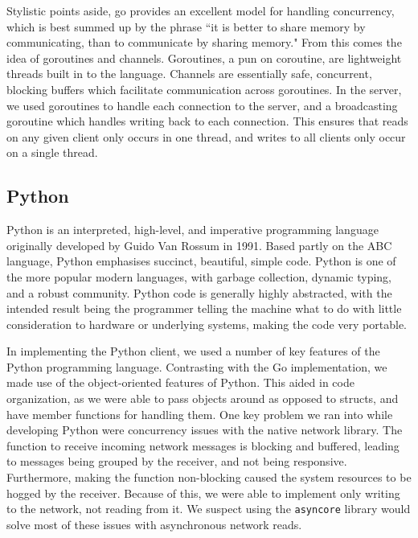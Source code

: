 \documentclass[12pt, letterpaper]{article}
\begin{document}
Stylistic points aside, go provides an excellent model for handling 
concurrency, which is best summed up by the phrase ``it is better to 
share memory by communicating, than to communicate by sharing memory." 
From this comes the idea of goroutines and channels. Goroutines, a pun 
on coroutine, are lightweight threads built in to the language. 
Channels are essentially safe, concurrent, blocking buffers which 
facilitate communication across goroutines. In the server, we used 
goroutines to handle each connection to the server, and a broadcasting 
goroutine which handles writing back to each connection. This ensures 
that reads on any given client only occurs in one thread, and writes to 
all clients only occur on a single thread.


\subsection*{Python}


Python is an interpreted, high-level, and imperative programming 
language originally developed by Guido Van Rossum in 1991. Based partly 
on the ABC language, Python emphasises succinct, beautiful, simple 
code. Python is one of the more popular modern languages, with garbage 
collection, dynamic typing, and a robust community. Python code is 
generally highly abstracted, with the intended result being the 
programmer telling the machine what to do with little consideration to 
hardware or underlying systems, making the code very portable.


In implementing the Python client, we used a number of key features of 
the Python programming language. Contrasting with the Go 
implementation, we made use of the object-oriented features of Python. 
This aided in code organization, as we were able to pass objects around 
as opposed to structs, and have member functions for handling them. One 
key problem we ran into while developing Python were concurrency issues 
with the native network library. The function to receive incoming 
network messages is blocking and buffered, leading to messages being 
grouped by the receiver, and not being responsive. Furthermore, making 
the function non-blocking caused the system resources to be hogged by 
the receiver. Because of this, we were able to implement only writing 
to the network, not reading from it. We suspect using the 
\verb+asyncore+ library would solve most of these issues with 
asynchronous network reads.
\end{document}
